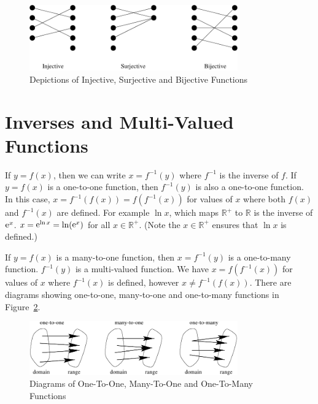 \begin{figure}[h!]
\begin{center}
\includegraphics[width=0.8\textwidth]{algebra/sets/jectives}
\end{center}
\caption{Depictions of Injective, Surjective and Bijective Functions}
\label{jectives}
\end{figure}










\section{Inverses and Multi-Valued Functions}


If $y = f(x)$, then we can write $x = f^{-1}(y)$ where $f^{-1}$ is the inverse of 
$f$.  If $y = f(x)$ is a one-to-one function, then $f^{-1}(y)$ is also
a one-to-one function.  In this case, $x = f^{-1}(f(x)) = f(f^{-1}(x))$
for values of $x$ where both $f(x)$ and $f^{-1}(x)$ are defined.
For example $\ln x$, which maps $\mathbb{R}^+$ to $\mathbb{R}$ is 
the inverse of $\mathop{\mathrm{e}}\nolimits^x$.  $x = \mathop{\mathrm{e}}\nolimits^{\ln x} = \ln( \mathop{\mathrm{e}}\nolimits^x )$ for all 
$x \in \mathbb{R}^+$.  (Note the $x \in \mathbb{R}^+$ ensures that 
$\ln x$ is defined.)

If $y = f(x)$ is a many-to-one function, then $x = f^{-1}(y)$ is a one-to-many
function.  $f^{-1}(y)$ is a multi-valued function.  We have
$x = f(f^{-1}(x))$ for values of $x$ where $f^{-1}(x)$ is defined, however 
$x \neq f^{-1}(f(x))$.  There are diagrams showing one-to-one, many-to-one
and one-to-many functions in Figure~\ref{tototo}.

\begin{figure}[h!]
\begin{center}
\includegraphics[width=0.8\textwidth]{algebra/sets/tototo}
\end{center}
\caption{Diagrams of One-To-One, Many-To-One and One-To-Many Functions}
\label{tototo}
\end{figure}






